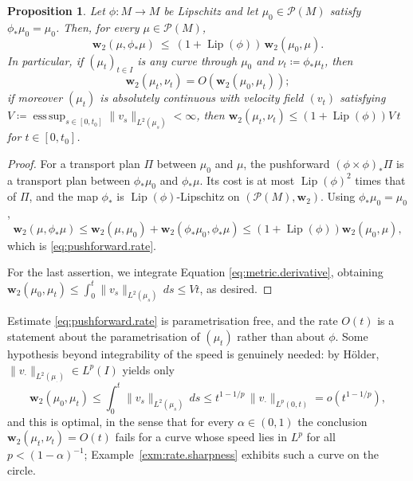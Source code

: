 \documentclass[11pt,reqno]{amsart}
\theoremstyle{plain}
\newtheorem{prp}[thm]{Proposition}
\theoremstyle{definition}
\newcommand{\dw}{\mathbf{w}_2}
\newcommand{\Prob}{\mathcal{P}}
\DeclareMathOperator{\Lip}{Lip}
\DeclareMathOperator*{\esssup}{ess\,sup}
\begin{document}
\begin{prp}\label{prp:pushforward.rate}
    Let \( \phi:M\to M \) be Lipschitz and let \( \mu_0\in\Prob(M) \) satisfy \( \phi_\ast\mu_0=\mu_0 \).
    Then, for every \( \mu\in\Prob(M) \),
    \begin{equation}\label{eq:pushforward.rate}
        \dw\left(\mu,\phi_\ast\mu\right)\ \le\ \left(1+\Lip(\phi)\right)\,\dw(\mu_0,\mu) .
    \end{equation}
    In particular, if \( (\mu_t)_{t\in I} \) is any curve through \( \mu_0 \) and \( \nu_t\coloneqq\phi_\ast\mu_t \), then
    \[
        \dw(\mu_t,\nu_t)=O\left(\dw(\mu_0,\mu_t)\right);
    \]
    if moreover \( (\mu_t) \) is absolutely continuous with velocity field \( (v_t) \) satisfying \( V \coloneqq\esssup_{s\in[0,t_0]}\lVert v_s\rVert_{L^2(\mu_s)}<\infty \), then \( \dw(\mu_t,\nu_t)\le(1+\Lip(\phi))V\,t \) for \( t\in[0,t_0] \).
\end{prp}

\begin{proof}
    For a transport plan \( \Pi \) between \( \mu_0 \) and \( \mu \), the pushforward \( (\phi\times\phi)_\ast\Pi \) is a transport plan between \( \phi_\ast\mu_0 \) and \( \phi_\ast\mu \).
    Its cost is at most \( \Lip(\phi)^2 \) times that of \( \Pi \), and the map \( \phi_\ast \) is \( \Lip(\phi) \)-Lipschitz on \( (\Prob(M),\dw) \).
    Using \( \phi_\ast\mu_0=\mu_0 \),
    \[
        \dw(\mu,\phi_\ast\mu)\le\dw(\mu,\mu_0)+\dw(\phi_\ast\mu_0,\phi_\ast\mu)\le\left(1+\Lip(\phi)\right)\dw(\mu_0,\mu),
    \]
    which is \eqref{eq:pushforward.rate}.

    For the last assertion, we integrate Equation \eqref{eq:metric.derivative}, obtaining \( \dw(\mu_0,\mu_t)\le\int_0^t\lVert v_s\rVert_{L^2(\mu_s)}\,ds\le V t \), as desired.
\end{proof}

Estimate \eqref{eq:pushforward.rate} is parametrisation free, and the rate \( O(t) \) is a statement about the parametrisation of \( (\mu_t) \) rather than about \( \phi \).
Some hypothesis beyond integrability of the speed is genuinely needed: by H\"older, \( \lVert v_\cdot\rVert_{L^2(\mu_\cdot)}\in L^p(I) \) yields only
\[
    \dw(\mu_0,\mu_t)\le\int_0^t\lVert v_s\rVert_{L^2(\mu_s)}\,ds\le t^{1-1/p}\,\lVert v_\cdot\rVert_{L^p(0,t)}=o\left(t^{1-1/p}\right),
\]
and this is optimal, in the sense that for every \( \alpha\in(0,1) \) the conclusion \( \dw(\mu_t,\nu_t)=O(t) \) fails for a curve whose speed lies in \( L^p \) for all \( p<(1-\alpha)^{-1} \); Example~\ref{exm:rate.sharpness} exhibits such a curve on the circle.
\end{document}
